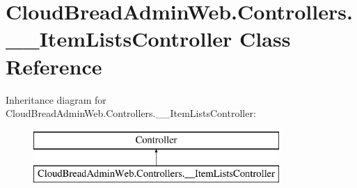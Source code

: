 \hypertarget{class_cloud_bread_admin_web_1_1_controllers_1_1_____item_lists_controller}{}\section{Cloud\+Bread\+Admin\+Web.\+Controllers.\+\_\+\+\_\+\+Item\+Lists\+Controller Class Reference}
\label{class_cloud_bread_admin_web_1_1_controllers_1_1_____item_lists_controller}
Inheritance diagram for Cloud\+Bread\+Admin\+Web.\+Controllers.\+\_\+\+\_\+\+Item\+Lists\+Controller\+:\begin{figure}[H]
\begin{center}
\leavevmode
\includegraphics[height=2.000000cm]{class_cloud_bread_admin_web_1_1_controllers_1_1_____item_lists_controller}
\end{center}
\end{figure}
